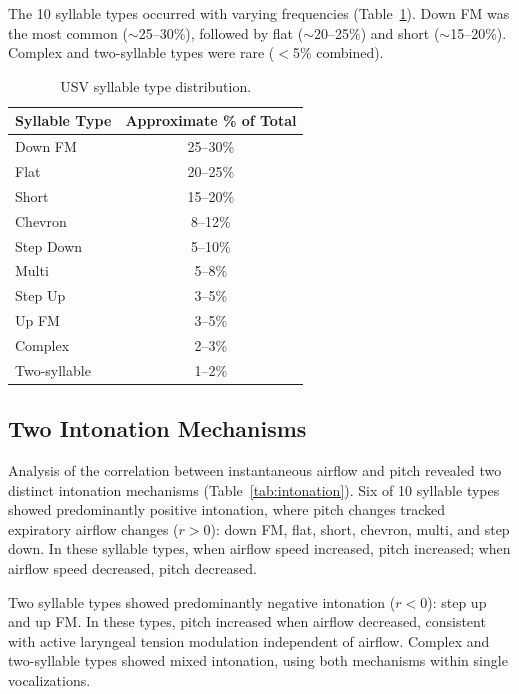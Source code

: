 \documentclass[11pt]{article}
\begin{document}
The 10 syllable types occurred with varying frequencies (Table~\ref{tab:types}). Down FM was the most common ($\sim$25--30\%), followed by flat ($\sim$20--25\%) and short ($\sim$15--20\%). Complex and two-syllable types were rare ($<$5\% combined).

\begin{table}[h]
\centering
\caption{USV syllable type distribution.}
\label{tab:types}
\begin{tabular}{lc}
\toprule
Syllable Type & Approximate \% of Total \\
\midrule
Down FM & 25--30\% \\
Flat & 20--25\% \\
Short & 15--20\% \\
Chevron & 8--12\% \\
Step Down & 5--10\% \\
Multi & 5--8\% \\
Step Up & 3--5\% \\
Up FM & 3--5\% \\
Complex & 2--3\% \\
Two-syllable & 1--2\% \\
\bottomrule
\end{tabular}
\end{table}

\subsection{Two Intonation Mechanisms}

Analysis of the correlation between instantaneous airflow and pitch revealed two distinct intonation mechanisms (Table~\ref{tab:intonation}). Six of 10 syllable types showed predominantly positive intonation, where pitch changes tracked expiratory airflow changes ($r > 0$): down FM, flat, short, chevron, multi, and step down. In these syllable types, when airflow speed increased, pitch increased; when airflow speed decreased, pitch decreased.

Two syllable types showed predominantly negative intonation ($r < 0$): step up and up FM. In these types, pitch increased when airflow decreased, consistent with active laryngeal tension modulation independent of airflow. Complex and two-syllable types showed mixed intonation, using both mechanisms within single vocalizations.
\end{document}
